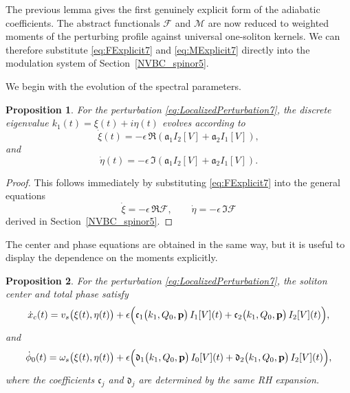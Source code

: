 \documentclass[11pt]{amsart}
\newtheorem{proposition}{Proposition}[section]
\theoremstyle{definition}
\numberwithin{equation}{section}
\begin{document}
The previous lemma gives the first genuinely explicit form of the adiabatic coefficients. The abstract functionals $\mathcal{F}$ and $\mathcal{M}$ are now reduced to weighted moments of the perturbing profile against universal one-soliton kernels. We can therefore substitute \eqref{eq:FExplicit7} and \eqref{eq:MExplicit7} directly into the modulation system of Section~\ref{NVBC_spinor5}.

We begin with the evolution of the spectral parameters.

\begin{proposition}
For the perturbation \eqref{eq:LocalizedPerturbation7}, the discrete eigenvalue $k_1(t)=\xi(t)+i\eta(t)$ evolves according to
\begin{equation}
\dot{\xi}(t)
=
-\epsilon\,
\Re\!\left(
\mathfrak{a}_1 I_2[V] + \mathfrak{a}_2 I_1[V]
\right),
\label{eq:xiExplicit7}
\end{equation}
and
\begin{equation}
\dot{\eta}(t)
=
-\epsilon\,
\Im\!\left(
\mathfrak{a}_1 I_2[V] + \mathfrak{a}_2 I_1[V]
\right).
\label{eq:etaExplicit7}
\end{equation}
\end{proposition}

\begin{proof}
This follows immediately by substituting \eqref{eq:FExplicit7} into the general equations
\[
\dot{\xi}=-\epsilon\,\Re \mathcal{F},
\qquad
\dot{\eta}=-\epsilon\,\Im \mathcal{F}
\]
derived in Section~\ref{NVBC_spinor5}.
\end{proof}

The center and phase equations are obtained in the same way, but it is useful to display the dependence on the moments explicitly.

\begin{proposition}
For the perturbation \eqref{eq:LocalizedPerturbation7}, the soliton center and total phase satisfy
\begin{equation}
\dot{x}_c(t)
=
v_s\bigl(\xi(t),\eta(t)\bigr)
+
\epsilon\Bigl(
\mathfrak{c}_1\bigl(k_1,Q_0,\mathbf{p}\bigr)\,I_1[V](t)
+
\mathfrak{c}_2\bigl(k_1,Q_0,\mathbf{p}\bigr)\,I_2[V](t)
\Bigr),
\label{eq:xcExplicit7}
\end{equation}
and
\begin{equation}
\dot{\phi}_0(t)
=
\omega_s\bigl(\xi(t),\eta(t)\bigr)
+
\epsilon\Bigl(
\mathfrak{d}_1\bigl(k_1,Q_0,\mathbf{p}\bigr)\,I_0[V](t)
+
\mathfrak{d}_2\bigl(k_1,Q_0,\mathbf{p}\bigr)\,I_2[V](t)
\Bigr),
\label{eq:phiExplicit7}
\end{equation}
where the coefficients $\mathfrak c_j$ and $\mathfrak d_j$ are determined by the same RH expansion.
\end{proposition}
\end{document}
